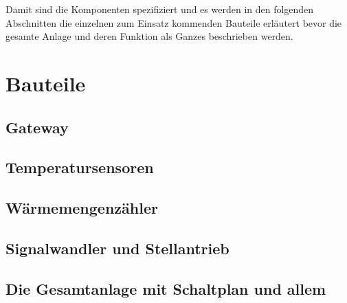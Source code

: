 Damit sind die Komponenten spezifiziert und es werden in den folgenden Abschnitten die einzelnen zum Einsatz kommenden Bauteile erläutert bevor die gesamte Anlage und deren Funktion als Ganzes beschrieben werden.

\section{Bauteile}

\subsection{Gateway}

\subsection{Temperatursensoren}

\subsection{Wärmemengenzähler}

\subsection{Signalwandler und Stellantrieb}

\subsection{Die Gesamtanlage mit Schaltplan und allem}